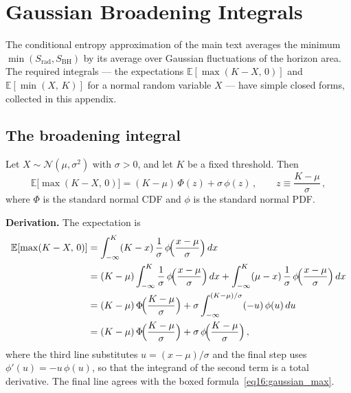 \documentclass[11pt,letterpaper]{article}
\theoremstyle{plain}
\theoremstyle{definition}
\theoremstyle{remark}
\begin{document}
\section{Gaussian Broadening Integrals}
\label{app:gaussian_integrals}

The conditional entropy approximation of the main text averages the minimum
$\min(S_{\mathrm{rad}}, S_{\mathrm{BH}})$ by its average over Gaussian
fluctuations of the horizon area.  The required integrals --- the
expectations $\mathbb{E}[\max(K - X,\, 0)]$ and $\mathbb{E}[\min(X,\, K)]$
for a normal random variable $X$ --- have simple closed forms, collected in
this appendix.

\subsection{The broadening integral}

Let $X \sim \mathcal{N}(\mu, \sigma^2)$ with $\sigma > 0$, and let $K$ be a
fixed threshold.  Then
\begin{equation}
  \boxed{\;
  \mathbb{E}\bigl[\max(K - X,\, 0)\bigr]
  = (K - \mu)\,\Phi(z) + \sigma\,\phi(z)\,,
  \qquad z \equiv \frac{K - \mu}{\sigma}\,,
  \;}
  \label{eq16:gaussian_max}
\end{equation}
where $\Phi$ is the standard normal CDF and $\phi$ is the standard normal PDF.

\textbf{Derivation.}  The expectation is
\begin{align}
  \mathbb{E}[\max(K - X,\, 0)]
  &= \int_{-\infty}^{K} (K - x)\,\frac{1}{\sigma}\,
  \phi\!\Bigl(\frac{x - \mu}{\sigma}\Bigr)\, dx \nonumber \\
  &= (K - \mu)\int_{-\infty}^{K}
  \frac{1}{\sigma}\,\phi\!\Bigl(\frac{x-\mu}{\sigma}\Bigr)\, dx
  + \int_{-\infty}^{K}
  (\mu - x)\,\frac{1}{\sigma}\,
  \phi\!\Bigl(\frac{x-\mu}{\sigma}\Bigr)\, dx \nonumber \\
  &= (K - \mu)\,\Phi\!\Bigl(\frac{K-\mu}{\sigma}\Bigr)
  + \sigma \int_{-\infty}^{(K-\mu)/\sigma} (-u)\,\phi(u)\, du \nonumber \\
  &= (K - \mu)\,\Phi\!\Bigl(\frac{K-\mu}{\sigma}\Bigr)
  + \sigma\,\phi\!\Bigl(\frac{K-\mu}{\sigma}\Bigr)\,,
  \label{eq16:gaussian_max_derivation}
\end{align}
where the third line substitutes $u = (x-\mu)/\sigma$ and the final step uses
$\phi'(u) = -u\,\phi(u)$, so that the integrand of the second term is a total
derivative.  The final line agrees with the boxed
formula~\eqref{eq16:gaussian_max}.
\end{document}
